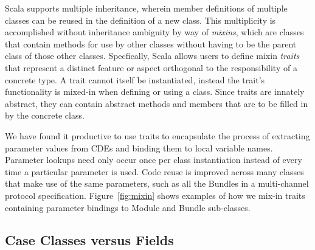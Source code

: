 Scala supports multiple inheritance, wherein member definitions of multiple classes can be reused in the definition of a new class.
This multiplicity is accomplished without inheritance ambiguity by way of {\em mixins},
which are classes that contain methods for use by other classes without having to be the parent class of those other classes.
Specfically, Scala allows users to define mixin {\em traits}
that represent a distinct feature or aspect orthogonal to the responsibility of a concrete type.
A trait cannot itself be instantiated, instead the trait's functionality is mixed-in when defining or using a class.
Since traits are innately abstract, they can contain abstract methods and members that are to be filled in by the concrete class.

We have found it productive to use traits to encapsulate the process of extracting parameter values from CDEs and binding them to local variable names.
Parameter lookups need only occur once per class instantiation instead of every time a particular parameter is used.
Code reuse is improved across many classes that make use of the same parameters, such as all the Bundles in
a multi-channel protocol specification.
Figure~\ref{fig:mixin} shows examples of how we mix-in traits containing parameter bindings to Module and Bundle sub-classes.

\subsection{Case Classes versus Fields}

